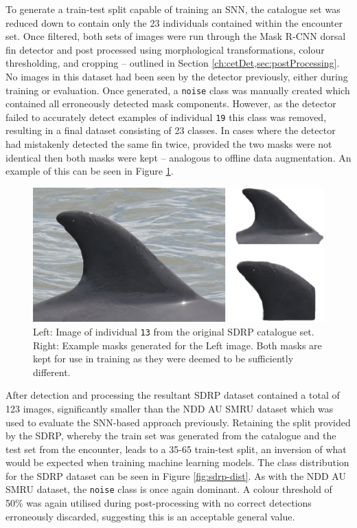 To generate a train-test split capable of training an SNN, the catalogue set was reduced down to contain only the 23 individuals contained within the encounter set. Once filtered, both sets of images were run through the Mask R-CNN dorsal fin detector and post processed using morphological transformations, colour thresholding, and cropping -- outlined in Section \ref{ch:cetDet,sec:postProcessing}. No images in this dataset had been seen by the detector previously, either during training or evaluation. Once generated, a \texttt{noise} class was manually created which contained all erroneously detected mask components. However, as the detector failed to accurately detect examples of individual \texttt{19} this class was removed, resulting in a final dataset consisting of 23 classes. In cases where the detector had mistakenly detected the same fin twice, provided the two masks were not identical then both masks were kept -- analogous to offline data augmentation. An example of this can be seen in Figure \ref{fig:sdrp-double-mask-eg}.

\begin{figure}
	\begin{center}
		\includegraphics[scale=0.5]{Chapter6/figs/SDRP-double-mask-eg-indv-13.png}
	\end{center}
	\caption[Left: Image of individual \texttt{13} from the original SDRP catalogue set. Right: Example masks generated for the Left image.]{Left: Image of individual \texttt{13} from the original SDRP catalogue set. Right: Example masks generated for the Left image. Both masks are kept for use in training as they were deemed to be sufficiently different.}
	\label{fig:sdrp-double-mask-eg}
\end{figure}

After detection and processing the resultant SDRP dataset contained a total of 123 images, significantly smaller than the NDD AU SMRU dataset which was used to evaluate the SNN-based approach previously. Retaining the split provided by the SDRP, whereby the train set was generated from the catalogue and the test set from the encounter, leads to a 35-65 train-test split, an inversion of what would be expected when training machine learning models. The class distribution for the SDRP dataset can be seen in Figure \ref{fig:sdrp-dist}. As with the NDD AU SMRU dataset, the \texttt{noise} class is once again dominant. A colour threshold of 50\% was again utilised during post-processing with no correct detections erroneously discarded, suggesting this is an acceptable general value.

